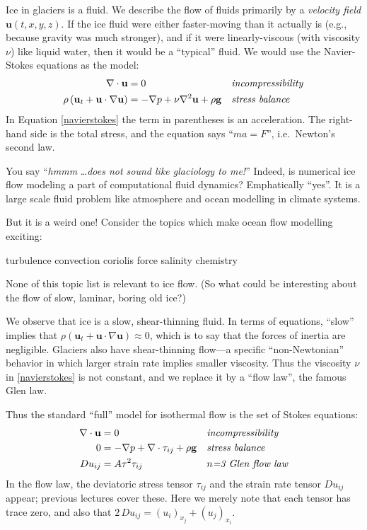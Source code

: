\documentclass[titlepage,letterpaper,final,12pt]{scrartcl}
\begin{document}
Ice in glaciers is a fluid.  We describe the flow of fluids primarily by a \emph{velocity field} $\mathbf{u}(t,x,y,z)$.  If the ice fluid were either faster-moving than it actually is (e.g., because gravity was much stronger), and if it were linearly-viscous (with viscosity $\nu$) like liquid water, then it would be a ``typical'' fluid.  We would use the Navier-Stokes equations as the model:
\begin{align}
\nabla \cdot \mathbf{u} &= 0 &&\text{\emph{incompressibility}} \label{incompressible} \\
\rho \left(\mathbf{u}_t + \mathbf{u}\cdot\nabla \mathbf{u}\right) &= -\nabla p + \nu \nabla^2 \mathbf{u} + \rho \mathbf{g} &&\text{\emph{stress balance}} \label{navierstokes}
\end{align}
In Equation \eqref{navierstokes} the term in parentheses is an acceleration.  The right-hand side is the total stress, and the equation says ``$ma=F$'', i.e.~Newton's second law.

You say ``\emph{hmmm} \dots \emph{does not sound like glaciology to me!}''  Indeed, is numerical ice flow modeling a part of computational fluid dynamics?  Emphatically ``yes''.  It is a large scale fluid problem like atmosphere and ocean modelling in climate systems.

But it is a weird one!  Consider the topics which make ocean flow modelling exciting:
  \begin{center} turbulence \qquad convection \qquad  coriolis force  \qquad salinity \qquad chemistry
  \end{center}
None of this topic list is relevant to ice flow.  (So what could be interesting about the flow of slow, laminar, boring old ice?)

We observe that ice is a slow, shear-thinning fluid.  In terms of equations, ``slow'' implies that $\rho \left(\mathbf{u}_t + \mathbf{u}\cdot\nabla \mathbf{u}\right) \approx 0$, which is to say that the forces of inertia are negligible.  Glaciers also have shear-thinning flow---a specific ``non-Newtonian'' behavior in which larger strain rate implies smaller viscosity.  Thus the viscosity $\nu$ in \eqref{navierstokes} is not constant, and we replace it by a ``flow law'', the famous Glen law.

Thus the standard ``full'' model for isothermal flow is the set of Stokes equations:
\begin{align}
\nabla \cdot \mathbf{u} &= 0 &&\text{\emph{incompressibility}} \label{incompressibleagain} \\
0 &= - \nabla p + \nabla \cdot \tau_{ij} + \rho \mathbf{g} &&\text{\emph{stress balance}} \label{forcebalance} \\
Du_{ij} &= A \tau^2 \tau_{ij} &&\text{\emph{$n$=3 Glen flow law}} \label{flowlaw}
\end{align}
In the flow law, the deviatoric stress tensor $\tau_{ij}$ and the strain rate tensor $Du_{ij}$ appear; previous lectures cover these.  Here we merely note that each tensor has trace zero, and also that $2\,Du_{ij} = (u_i)_{x_j}+(u_j)_{x_i}$.
\end{document}
